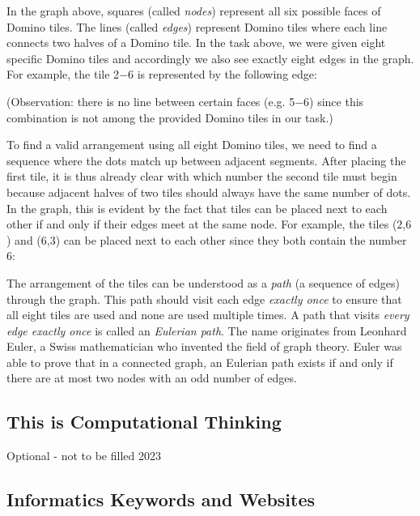\documentclass[a4paper,11pt]{report}
\newcommand{\taskGraphicsFolder}{..}
\begin{document}
In the graph above, squares (called \emph{nodes}) represent all six possible faces of Domino tiles. The lines (called \emph{edges}) represent Domino tiles where each line connects two halves of a Domino tile. In the task above, we were given eight specific Domino tiles and accordingly we also see exactly eight edges in the graph. For example, the tile 2$-6$ is represented by the following edge:

{\centering%
\par}

(Observation: there is no line between certain faces (e.g. 5$-6$) since this combination is not among the provided Domino tiles in our task.)

To find a valid arrangement using all eight Domino tiles, we need to find a sequence where the dots match up between adjacent segments. After placing the first tile, it is thus already clear with which number the second tile must begin because adjacent halves of two tiles should always have the same number of dots. In the graph, this is evident by the fact that tiles can be placed next to each other if and only if their edges meet at the same node. For example, the tiles ($2$,$6$) and ($6$,$3$) can be placed next to each other since they both contain the number $6$:

{\centering%
\par}

The arrangement of the tiles can be understood as a \emph{path} (a sequence of edges) through the graph. This path should visit each edge \emph{exactly once} to ensure that all eight tiles are used and none are used multiple times. A path that visits \emph{every edge exactly once} is called an \emph{Eulerian path}. The name originates from Leonhard Euler, a Swiss mathematician who invented the field of graph theory. Euler was able to prove that in a connected graph, an Eulerian path exists if and only if there are at most two nodes with an odd number of edges.


\subsection*{This is Computational Thinking}

Optional - not to be filled 2023


\subsection*{Informatics Keywords and Websites}
\end{document}
